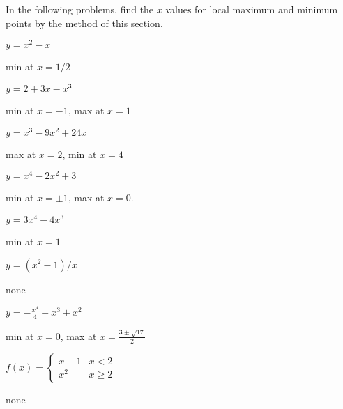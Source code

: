 \begin{exercises} 
\noindent In the following problems, find the $x$ values for local
maximum and minimum points by the method of this section.

\twocol
\begin{exercise} $y=x^2-x$ 
\begin{answer} min at $x=1/2$
\end{answer}\end{exercise}

\begin{exercise} $y=2+3x-x^3$ 
\begin{answer} min at $x=-1$, max at $x=1$
\end{answer}\end{exercise}

\begin{exercise} $y=x^3-9x^2+24x$
\begin{answer} max at $x=2$, min at $x=4$
\end{answer}\end{exercise}

\begin{exercise} $y=x^4-2x^2+3$ 
\begin{answer} min at $x=\pm 1$, max at $x=0$.
\end{answer}\end{exercise}

\begin{exercise} $y=3x^4-4x^3$
\begin{answer} min at $x=1$
\end{answer}\end{exercise}

\begin{exercise} $y=(x^2-1)/x$
\begin{answer} none
\end{answer}\end{exercise}

\begin{exercise} $y=-\frac{x^4}{4}+x^3+x^2$ 
\begin{answer} min at $x=0$, max at $x=\frac{3\pm \sqrt{17}}{2}$
\end{answer}\end{exercise}

\begin{exercise} $f(x) = \begin{cases} x-1 & x < 2  \\
x^2 & x\geq 2 \end{cases}$
\begin{answer} none
\end{answer}\end{exercise}


\end{exercises}
